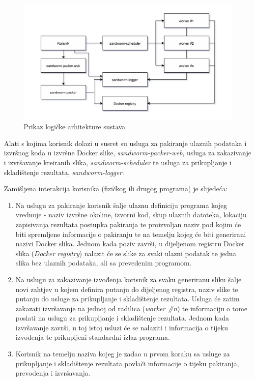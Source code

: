 \documentclass[times, utf8, zavrsni]{fer}
\begin{document}
\begin{figure}[H]
	\centering
	\includegraphics[width=\textwidth]{sandworm-schema.png}
	\caption{Prikaz logičke arhitekture sustava}
\end{figure}

Alati s kojima korisnik dolazi u susret su usluga za pakiranje ulaznih podataka i izvršnog koda u izvršne Docker slike, {\textit{sandworm-packer-web}}, usluga za zakazivanje i izvršavanje kreiranih slika, {\textit{sandworm-scheduler}} te usluga za prikupljanje i skladištenje rezultata, {\textit{sandworm-logger}}.

\hfill
\break

Zamišljena interakcija korisnika (fizičkog ili drugog programa) je slijedeća:

\begin{enumerate}
\item Na uslugu za pakiranje korisnik šalje ulaznu definiciju programa kojeg vrednuje - naziv izvršne okoline, izvorni kod, skup ulaznih datoteka, lokaciju zapisivanja rezultata postupka pakiranja te proizvoljan naziv pod kojim će biti spremljene informacije o pakiranju te na temelju kojeg će biti generirani nazivi Docker slika. Jednom kada poziv završi, u dijeljenom registru Docker slika ({\textit{Docker registry}}) nalazit će se slike za svaki ulazni podatak te jedna slika bez ulaznih podataka, ali sa prevedenim programom.
\item Na uslugu za zakazivanje izvođenja korisnik za svaku generiranu sliku šalje novi zahtjev u kojem definira putanju do dijeljenog registra, naziv slike te putanju do usluge za prikupljanje i skladištenje rezultata. Usluga će zatim zakazati izvršavanje na jednoj od radilica ({\textit{worker \#n}}) te informaciju o tome poslati na uslugu za prikupljanje i skladištenje rezultata. Jednom kada izvršavanje završi, u toj istoj usluzi će se nalaziti i informacija o tijeku izvođenja te prikupljeni standardni izlaz programa.
\item Korisnik na temelju naziva kojeg je zadao u prvom koraku sa usluge za prikupljanje i skladištenje rezultata povlači informacije o tijeku pakiranja, prevođenja i izvršavanja.
\end{enumerate}
\end{document}
